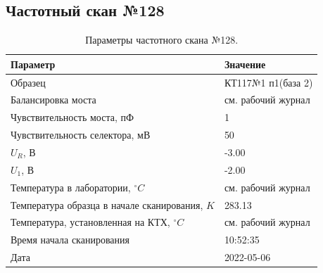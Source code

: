 \subsection{Частотный скан №128}
\begin{table}[!ht]
    \centering
    \caption{Параметры частотного скана №128.}
    \begin{tabular}{|l|l|}
        \hline
        Параметр                                       & Значение                  \\ \hline
        Образец                                        & КТ117№1 п1(база 2)        \\ \hline
        Балансировка моста                             & см. рабочий журнал        \\ \hline
        Чувствительность моста, пФ                     & 1                         \\ \hline
        Чувствительность селектора, мВ                 & 50                        \\ \hline
        $U_R$, В                                       & -3.00                     \\ \hline
        $U_1$, В                                       & -2.00                     \\ \hline
        Температура в лаборатории, $^\circ C$          & см. рабочий журнал        \\ \hline
        Температура образца в начале сканирования, $K$ & 283.13                    \\ \hline
        Температура, установленная на КТХ, $^\circ C$  & см. рабочий журнал        \\ \hline
        Время начала сканирования                      & 10:52:35                  \\ \hline
        Дата                                           & 2022-05-06                \\ \hline
    \end{tabular}
    \label{table:frequency_scan_128}
\end{table}

